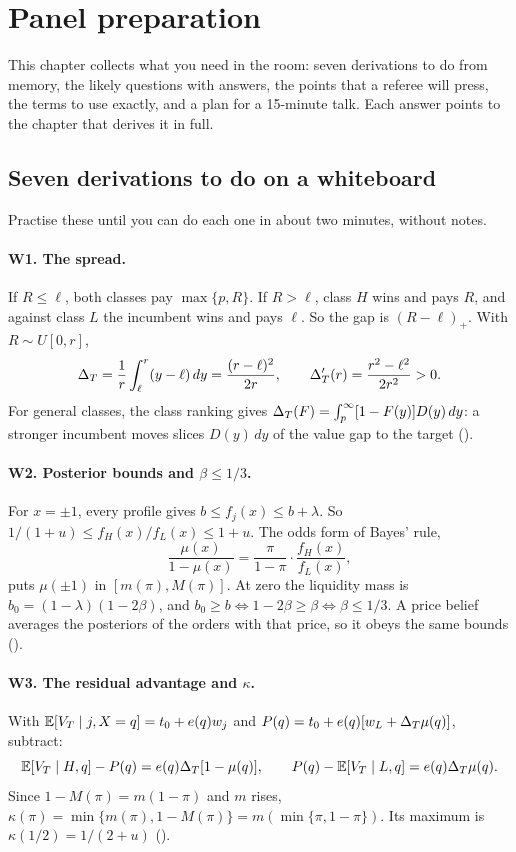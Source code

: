 \section{Panel preparation}\label{sec:13_panel}

This chapter collects what you need in the room: seven derivations to do from memory, the likely questions with
answers, the points that a referee will press, the terms to use exactly, and a plan for a 15-minute talk. Each
answer points to the chapter that derives it in full.

\subsection{Seven derivations to do on a whiteboard}\label{sec:13_panel-whiteboard}

Practise these until you can do each one in about two minutes, without notes.

\paragraph{W1. The spread.} If \(R\le\ell\), both classes pay \(\max\{p,R\}\). If \(R>\ell\), class \(H\) wins and
pays \(R\), and against class \(L\) the incumbent wins and pays \(\ell\). So the gap is \((R-\ell)_+\). With
\(R\sim U[0,r]\),
\[
\Delta_T=\frac1r\int_\ell^r(y-\ell)\,dy=\frac{(r-\ell)^2}{2r},\qquad \Delta_T'(r)=\frac{r^2-\ell^2}{2r^2}>0 .
\]
For general classes, the class ranking gives \(\Delta_T(F)=\int_p^\infty[1-F(y)]D(y)\,dy\): a stronger incumbent moves
slices \(D(y)\,dy\) of the value gap to the target ().

\paragraph{W2. Posterior bounds and \texorpdfstring{\(\beta\le1/3\)}{beta <= 1/3}.} For \(x=\pm1\), every profile gives
\(b\le f_j(x)\le b+\lambda\). So \(1/(1+u)\le f_H(x)/f_L(x)\le1+u\). The odds form of Bayes' rule,
\[
\frac{\mu(x)}{1-\mu(x)}=\frac{\pi}{1-\pi}\cdot\frac{f_H(x)}{f_L(x)},
\]
puts \(\mu(\pm1)\) in \([m(\pi),M(\pi)]\). At zero the liquidity mass is \(b_0=(1-\lambda)(1-2\beta)\), and
\(b_0\ge b\iff1-2\beta\ge\beta\iff\beta\le1/3\). A price belief averages the posteriors of the orders with that
price, so it obeys the same bounds ().

\paragraph{W3. The residual advantage and \texorpdfstring{\(\kappa\)}{kappa}.} With \(\mathbb{E}[V_T\mid j,X=q]=t_0+e(q)w_j\) and
\(P(q)=t_0+e(q)[w_L+\Delta_T\mu(q)]\), subtract:
\[
\mathbb{E}[V_T\mid H,q]-P(q)=e(q)\Delta_T[1-\mu(q)],\qquad P(q)-\mathbb{E}[V_T\mid L,q]=e(q)\Delta_T\mu(q).
\]
Since \(1-M(\pi)=m(1-\pi)\) and \(m\) rises, \(\kappa(\pi)=\min\{m(\pi),1-M(\pi)\}=m(\min\{\pi,1-\pi\})\). Its maximum is
\(\kappa(1/2)=1/(2+u)\) ().

